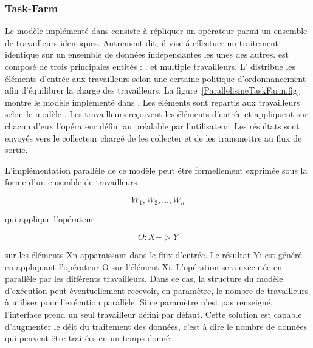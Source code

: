\subsubsection{Task-Farm}

Le mod\`ele  impl\'ement\'e dans   consiste \`a r\'epliquer un op\'erateur parmi un ensemble de travailleurs identiques. Autrement dit, il vise \'a effectuer un traitement identique sur un ensemble de donn\'ees ind\'ependantes les unes des autres.  est compos\'e de trois principales entit\'es : ,  et multiple travailleurs. L' distribue les \'el\'ements d'entr\'ee aux travailleurs selon une certaine politique d'ordonnancement afin d'\'equilibrer la charge des travailleurs. La figure~\ref{ParallelismeTaskFarm.fig} montre le mod\`ele  impl\'ement\'e dans . Les \'el\'ements sont repartis aux travailleurs selon le mod\`ele . Les travailleurs re\c coivent les \'el\'ements d'entr\'ee et appliquent sur chacun d'eux l'op\'erateur d\'efini au pr\'ealable par l'utilisateur. Les r\'esultats sont envoy\'es vers le collecteur charg\'e de les collecter et de les transmettre au flux de sortie.

L'impl\'ementation parall\`ele de ce mod\`ele peut \^etre formellement exprim\'ee sous la forme d'un ensemble de travailleurs 

\[
	{W_1, W_2,\ldots, W_n}
\]

qui applique l'op\'erateur 

\[
	O : X -> Y
\]

sur les \'el\'ements Xn apparaissant dans le flux d'entr\'ee. Le r\'esultat Yi est g\'en\'er\'e en appliquant l'op\'erateur O sur l'\'el\'ement Xi. L'op\'eration sera ex\'ecut\'ee en parall\`ele par les diff\'erents travailleurs. Dans ce cas, la structure du mod\`ele d'ex\'ecution peut \'eventuellement recevoir, en param\`etre, le nombre de travailleurs \`a utiliser pour l'ex\'ecution parall\`ele. Si ce param\`etre n'est pas renseign\'e, l'interface prend un seul travailleur d\'efini par d\'efaut. Cette solution est capable d'augmenter le d\'eit du traitement des donn\'ees, c'est \`a dire le nombre de donn\'ees qui peuvent \^etre trait\'ees en un temps donn\'e.

